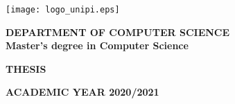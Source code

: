 \begin{titlepage}
	\begin{center}
		\texttt{[image: logo\_unipi.eps]}

		\vspace{1cm}
		\large
		\textbf{\MakeUppercase{Department of Computer Science}}\\
		\textbf{Master's degree in Computer Science}

		\vspace{3cm}
		\Large
		\textbf{\MakeUppercase{Thesis}}

		\vspace{0.5cm}
		\LARGE
		\textbf{\thesistitle}

		\vspace{3.5cm}
		\Large
		\peopleheader
		\textbf{\authornamefl} \hfill \textbf{\supervisors}

		\vfill
		\large
		\textbf{\MakeUppercase{Academic year 2020/2021}}
    \end{center}
\end{titlepage}
